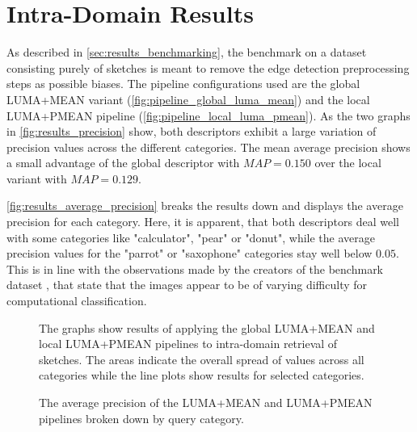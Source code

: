 \section{Intra-Domain Results}\label{sec:intra_results}

As described in \autoref{sec:results_benchmarking}, the benchmark on a dataset
consisting purely of sketches is meant to remove the edge detection
preprocessing steps as possible biases. The pipeline configurations used are
the global LUMA+MEAN variant (\autoref{fig:pipeline_global_luma_mean}) and the
local LUMA+PMEAN pipeline (\autoref{fig:pipeline_local_luma_pmean}). As the two
graphs in \autoref{fig:results_precision} show, both descriptors exhibit a
large variation of precision values across the different categories. The mean
average precision shows a small advantage of the global descriptor with
$MAP=0.150$ over the local variant with $MAP=0.129$.

\autoref{fig:results_average_precision} breaks the results down and displays
the average precision for each category. Here, it is apparent, that both
descriptors deal well with some categories like "calculator", "pear" or "donut",
while the average precision values for the "parrot" or "saxophone" categories
stay well below $0.05$. This is in line with the observations made by the
creators of the benchmark dataset \autocite{eitz_how_2012}, that state that the
images appear to be of varying difficulty for computational classification.

\begin{figure}[h]
    \centering
    \quad
    \caption[Precision and Recall Results]{
        The graphs show results of applying the global LUMA+MEAN
         and local LUMA+PMEAN
         pipelines to
        intra-domain retrieval of sketches. The areas indicate the overall
        spread of values across all categories while the line plots show
        results for selected categories.
    }
    \label{fig:results_precision}
\end{figure}

\begin{figure}[h]
    \centering
    
    \caption[Average Precision by Category]{
        The average precision of the LUMA+MEAN and LUMA+PMEAN pipelines broken
        down by query category.
    }
    \label{fig:results_average_precision}
\end{figure}

\FloatBarrier

